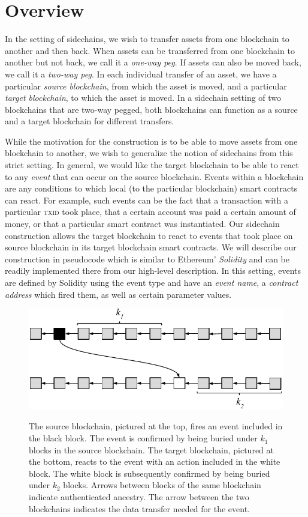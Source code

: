 \section{Overview}
In the setting of sidechains, we wish to transfer assets from one blockchain to
another and then back. When assets can be transferred from one blockchain to
another but not back, we call it a \emph{one-way peg}. If assets can also be
moved back, we call it a \emph{two-way peg}. In each individual transfer of an
asset, we have a particular \emph{source blockchain}, from which the asset is
moved, and a particular \emph{target blockchain}, to which the asset is moved.
In a sidechain setting of two blockchains that are two-way pegged, both
blockchains can function as a source and a target blockchain for different
transfers.

While the motivation for the construction is to be able to move assets from one
blockchain to another, we wish to generalize the notion of sidechains from this
strict setting. In general, we would like the target blockchain to be able to
react to any \emph{event} that can occur on the source blockchain. Events within
a blockchain are any conditions to which local (to the particular blockchain)
smart contracts can react. For example, such events can be the fact that a
transaction with a particular \textsc{txid} took place, that a certain account
was paid a certain amount of money, or that a particular smart contract was
instantiated. Our sidechain construction allows the target blockchain to react
to events that took place on source blockchain in its target blockchain smart
contracts. We will describe our construction in pseudocode which is similar to
Ethereum' \emph{Solidity} and can be readily implemented there from our
high-level description. In this setting, events are defined by Solidity using
the \textsf{event} type and have an \emph{event name}, a \emph{contract address}
which fired them, as well as certain parameter values.

\begin{figure}
    \caption{The source blockchain, pictured at the top, fires an event
             included in the black block. The event is confirmed by being buried
             under $k_1$ blocks in the source blockchain. The target blockchain,
             pictured at the bottom, reacts to the event with an action included
             in the white block. The white block is subsequently confirmed by
             being buried under $k_2$ blocks. Arrows between blocks of the same
             blockchain indicate authenticated ancestry. The arrow between the
             two blockchains indicates the data transfer needed for the event.}
    \centering
    \includegraphics[width=0.7 \columnwidth,keepaspectratio]{figures/events.pdf}
    \label{fig.events}
\end{figure}

